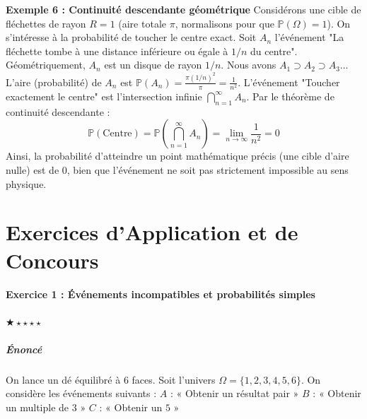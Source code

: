 \documentclass[11pt,a4paper]{article}
\begin{document}
\textbf{Exemple 6 : Continuité descendante géométrique}
Considérons une cible de fléchettes de rayon $R=1$ (aire totale $\pi$, normalisons pour que $\mathbb{P}(\Omega) = 1$). On s'intéresse à la probabilité de toucher le centre exact.
Soit $A_n$ l'événement "La fléchette tombe à une distance inférieure ou égale à $1/n$ du centre".
Géométriquement, $A_n$ est un disque de rayon $1/n$.
Nous avons $A_1 \supset A_2 \supset A_3 \dots$
L'aire (probabilité) de $A_n$ est $\mathbb{P}(A_n) = \frac{\pi (1/n)^2}{\pi} = \frac{1}{n^2}$.
L'événement "Toucher exactement le centre" est l'intersection infinie $\bigcap_{n=1}^\infty A_n$.
Par le théorème de continuité descendante :
$$ \mathbb{P}\left( \text{Centre} \right) = \mathbb{P}\left( \bigcap_{n=1}^\infty A_n \right) = \lim_{n \to \infty} \frac{1}{n^2} = 0 $$
Ainsi, la probabilité d'atteindre un point mathématique précis (une cible d'aire nulle) est de $0$, bien que l'événement ne soit pas strictement impossible au sens physique.

\begin{center}
\end{center}



\newpage
\part{Exercices d'Application et de Concours}
\subsection*{Exercice 1 : Événements incompatibles et probabilités simples}
$\bigstar\star\star\star\star$

\subsubsection*{Énoncé}

On lance un dé équilibré à $6$ faces. Soit l'univers $\Omega = \{1, 2, 3, 4, 5, 6\}$.
On considère les événements suivants :
$A$ : « Obtenir un résultat pair »
$B$ : « Obtenir un multiple de $3$ »
$C$ : « Obtenir un $5$ »
\end{document}
